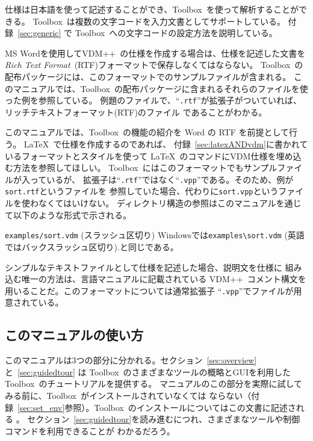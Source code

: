 \documentclass[\pformat,12pt]{jarticle}
\newcommand{\vdmslpp}{VDM++}
\newcommand{\Toolbox}{Toolbox}
\newcommand{\vdmext}{vpp}
\begin{document}
仕様は日本語を使って記述することができ、\Toolbox\ を使って解析することができる。
\Toolbox\ は複数の文字コードを入力文書としてサポートしている。
付録~\ref{sec:generic}
で \Toolbox\ への文字コードの設定方法を説明している。

MS Wordを使用して\vdmslpp\ の仕様を作成する場合は、仕様を記述した文書を
{\em Rich Text Format\/}~(RTF)フォーマットで保存しなくてはならない。
\Toolbox\ の配布パッケージには、このフォーマットでのサンプルファイルが含まれる。
このマニュアルでは、\Toolbox\ の配布パッケージに含まれるそれらのファイルを使った例を参照している。
例題のファイルで、``{\tt .rtf}''が拡張子がついていれば、リッチテキストフォーマット(RTF)のファイル
であることがわかる。

このマニュアルでは、\Toolbox\ の機能の紹介を Word の RTF を前提として行う。
\LaTeX\ で仕様を作成するのであれば、
付録~\ref{sec:latexANDvdm}に書かれているフォーマットとスタイルを使って
\LaTeX\ のコマンドにVDM仕様を埋め込む方法を参照してほしい。
\Toolbox\ にはこのフォーマットでもサンプルファイルが入っているが、
拡張子は``{\tt .rtf}''ではなく``{\tt .\vdmext}''である。そのため、例が{\tt sort.rtf}というファイルを
参照していた場合、代わりに{\tt sort.\vdmext}というファイルを使わなくてはいけない。
ディレクトリ構造の参照はこのマニュアルを通じて以下のような形式で示される。

{\tt examples/sort.vdm} (スラッシュ区切り)  
Windowsでは\verb+examples\sort.vdm+ (英語ではバックスラッシュ区切り).と同じである。

シンプルなテキストファイルとして仕様を記述した場合、説明文を仕様に
組み込む唯一の方法は、言語マニュアルに記載されている
\vdmslpp\ コメント構文を用いることだ。このフォーマットについては通常拡張子
``{\tt .\vdmext}''でファイルが用意されている。

\subsection*{このマニュアルの使い方}


このマニュアルは3つの部分に分かれる。セクション~\ref{sec:overview}と~\ref{sec:guidedtour} は
\Toolbox\ のさまざまなツールの概略とGUIを利用した\Toolbox\ のチュートリアルを提供する。
マニュアルのこの部分を実際に試してみる前に、\Toolbox\ がインストールされていなくては
ならない（付録~\ref{sec:set_env}参照）。\Toolbox\ のインストールについてはこの文書に記述される
 。
セクション~\ref{sec:guidedtour}を読み進むにつれ、さまざまなツールや制御コマンドを利用できることが
わかるだろう。
\end{document}

